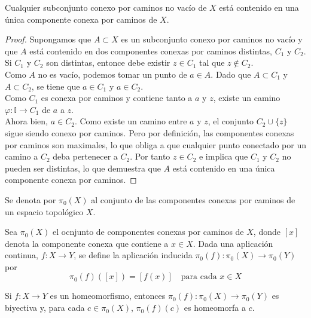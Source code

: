 \begin{corolario} 
    Cualquier subconjunto conexo por caminos no vacío de $X$ está contenido en una única componente conexa por caminos de $X$.
\end{corolario}
\begin{proof}
    Supongamos que $A \subset X$ es un subconjunto conexo por caminos no vacío y que $A$ está contenido en dos componentes conexas por caminos distintas, $C_1$ y $C_2$. Si $C_1$ y $C_2$ son distintas, entonce debe existir $z \in C_1$ tal que $z \notin C_2$. \\
    Como $A$ no es vacío, podemos tomar un punto de $a \in A$. Dado que $A \subset C_1$ y $A \subset C_2$, se tiene que $a \in C_1$ y $a \in C_2$. \\
    Como $C_1$ es conexa por caminos y contiene tanto a $a$ y $z$, existe un camino $\varphi \colon \mathbb{I} \to C_1$ de $a$ a $z$. \\
    Ahora bien, $a \in C_2$. Como existe un camino entre $a$ y $z$, el conjunto $C_2 \cup \{z\}$ sigue siendo conexo por caminos. Pero por definición, las componentes conexas por caminos son maximales, lo que obliga a que cualquier punto conectado por un camino a $C_2$ deba pertenecer a $C_2$. Por tanto $z \in C_2$ e implica que $C_1$ y $C_2$ no pueden ser distintas, lo que demuestra que $A$ está contenido en una única componente conexa por caminos. 
\end{proof}
\begin{definición}
    Se denota por $\pi_0(X)$ al conjunto de las componentes conexas por caminos de un espacio topológico $X$.
\end{definición}
\begin{definición}[Función $\pi_0$]
    Sea $\pi_0(X)$ el ocnjunto de componentes conexas por caminos de $X$, donde $[x]$ denota la componente conexa que contiene a $x \in X$. Dada una aplicación continua, $f: X \to Y$, se define la aplicación inducida $\pi_0(f): \pi_0(X) \to \pi_0(Y)$ por
    \[
    \pi_0(f)([x]) = [f(x)] \quad \text{para cada } x \in X
    \]
\end{definición}
\begin{proposición}
    Si $f \colon X \to Y$ es un homeomorfismo, entonces $\pi_0(f) \colon \pi_0(X) \to \pi_0(Y)$ es biyectiva y, para cada $c \in \pi_0(X)$, $\pi_0(f)(c)$ es homeomorfa a $c$.
\end{proposición}
